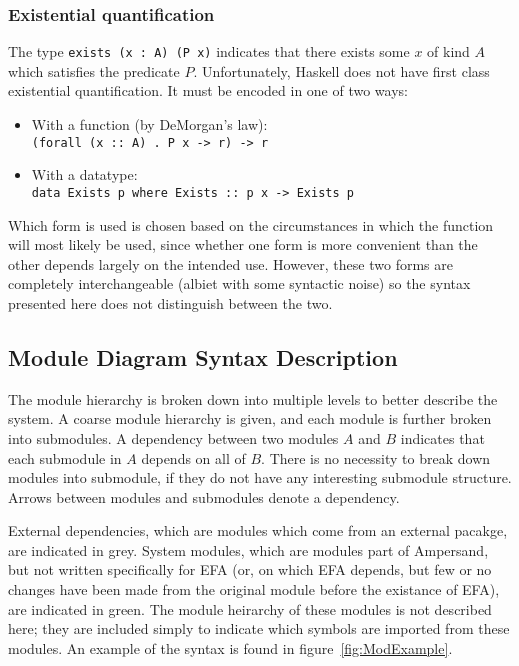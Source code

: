 \documentclass[12pt, svgnames]{article}
\let\Oldsubsection\subsection
\renewcommand{\subsection}{\FloatBarrier\Oldsubsection}
\let\Oldsubsubsection\subsubsection
\renewcommand{\subsubsection}{\FloatBarrier\Oldsubsubsection}
\begin{document}
\subsubsection*{Existential quantification}
The type \lstinline!exists (x : A) (P x)! indicates that there exists some $x$
of kind $A$ which satisfies the predicate $P$. Unfortunately, Haskell does not
have first class existential quantification. It must be encoded in one of
two ways:

\begin{itemize}
\item With a function (by DeMorgan's law): \\ \texttt{(forall (x :: A) . P x -> r) -> r}
\item With a datatype: \\ \texttt{data Exists p where Exists :: p x -> Exists p}
\end{itemize} 

Which form is used is chosen based on the circumstances in which the function
will most likely be used, since whether one form is more convenient than the
other depends largely on the intended use. However, these two forms are
completely interchangeable (albiet with some syntactic noise) so the syntax
presented here does not distinguish between the two. 

\subsection{Module Diagram Syntax Description}\label{subsec:ModuleSyntax}

The module hierarchy is broken down into multiple levels to better describe the
system.  A coarse module hierarchy is given, and each module is further broken
into submodules.  A dependency between two modules $A$ and $B$ indicates that
each submodule in $A$ depends on all of $B$. There is no necessity to break
down modules into submodule, if they do not have any interesting submodule 
structure. Arrows between modules and submodules denote a dependency. 

External dependencies, which are modules which come from an external pacakge,
are indicated in {\color{grey}grey}. System modules, which are modules part of
Ampersand, but not written specifically for EFA (or, on which EFA depends, but
few or no changes have been made from the original module before the existance
of EFA), are indicated in {\color{applegreen}green}. The module heirarchy of
these modules is not described here; they are included simply to indicate which
symbols are imported from these modules. An example of the syntax is found in
figure~\ref{fig:ModExample}.
\end{document}
